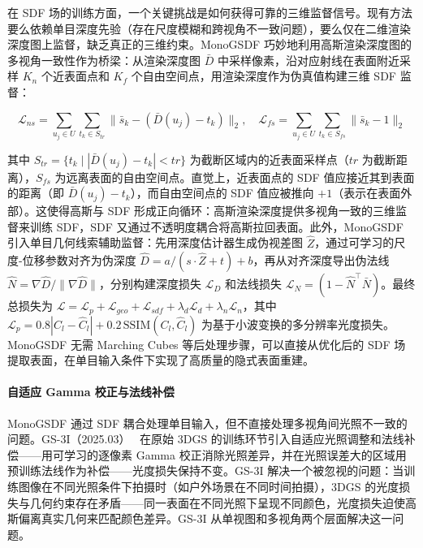 在 SDF 场的训练方面，一个关键挑战是如何获得可靠的三维监督信号。现有方法要么依赖单目深度先验（存在尺度模糊和跨视角不一致问题），要么仅在二维渲染深度图上监督，缺乏真正的三维约束。MonoGSDF 巧妙地利用高斯渲染深度图的多视角一致性作为桥梁：从渲染深度图 $\bar{D}$ 中采样像素，沿对应射线在表面附近采样 $K_n$ 个近表面点和 $K_f$ 个自由空间点，用渲染深度作为伪真值构建三维 SDF 监督：

\begin{equation}
\mathcal{L}_{ns} = \sum_{u_j \in U} \sum_{t_k \in S_{tr}} \|\bar{s}_k - (\bar{D}(u_j) - t_k)\|_2, \quad \mathcal{L}_{fs} = \sum_{u_j \in U} \sum_{t_k \in S_{fs}} \|\bar{s}_k - 1\|_2
\end{equation}

其中 $S_{tr} = \{t_k \mid |\bar{D}(u_j) - t_k| < tr\}$ 为截断区域内的近表面采样点（$tr$ 为截断距离），$S_{fs}$ 为远离表面的自由空间点。直觉上，近表面点的 SDF 值应接近其到表面的距离（即 $\bar{D}(u_j) - t_k$），而自由空间点的 SDF 值应被推向 $+1$（表示在表面外部）。这使得高斯与 SDF 形成正向循环：高斯渲染深度提供多视角一致的三维监督来训练 SDF，SDF 又通过不透明度耦合将高斯拉回表面。此外，MonoGSDF 引入单目几何线索辅助监督：先用深度估计器生成伪视差图 $\hat{Z}$，通过可学习的尺度-位移参数对齐为伪深度 $\hat{D} = a / (s \cdot \hat{Z} + t) + b$，再从对齐深度导出伪法线 $\hat{N} = \nabla \hat{D} / \|\nabla \hat{D}\|$，分别构建深度损失 $\mathcal{L}_D$ 和法线损失 $\mathcal{L}_N = (1 - \hat{N}^\top \bar{N})$。最终总损失为 $\mathcal{L} = \mathcal{L}_p + \mathcal{L}_{geo} + \mathcal{L}_{sdf} + \lambda_d \mathcal{L}_d + \lambda_n \mathcal{L}_n$，其中 $\mathcal{L}_p = 0.8|C_l - \hat{C}_l| + 0.2 \, \text{SSIM}(C_l, \hat{C}_l)$ 为基于小波变换的多分辨率光度损失。MonoGSDF 无需 Marching Cubes 等后处理步骤，可以直接从优化后的 SDF 场提取表面，在单目输入条件下实现了高质量的隐式表面重建。

\paragraph{自适应 Gamma 校正与法线补偿}

MonoGSDF 通过 SDF 耦合处理单目输入，但不直接处理多视角间光照不一致的问题。GS-3I（2025.03）~\cite{2503_12335} 在原始 3DGS 的训练环节引入自适应光照调整和法线补偿——用可学习的逐像素 Gamma 校正消除光照差异，并在光照误差大的区域用预训练法线作为补偿——光度损失保持不变。GS-3I 解决一个被忽视的问题：当训练图像在不同光照条件下拍摄时（如户外场景在不同时间拍摄），3DGS 的光度损失与几何约束存在矛盾——同一表面在不同光照下呈现不同颜色，光度损失迫使高斯偏离真实几何来匹配颜色差异。GS-3I 从单视图和多视角两个层面解决这一问题。


